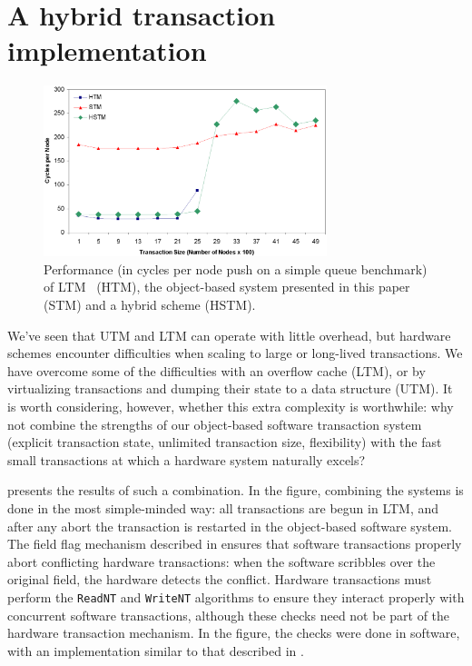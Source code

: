 \section{A hybrid transaction implementation}\label{sec:hybrid}

\begin{figure}\begin{center}%
\includegraphics[width=3.25in,clip=true]{Figures/sean_lie_6b}%
\end{center}%
\caption[Hybrid performance on simple queue benchmark.]
{Performance (in cycles per node push on a simple queue
  benchmark) of LTM~\cite{AnanianAsKuLeLi05} (HTM), the
  object-based system presented in this paper (STM) and a hybrid
  scheme (HSTM).}%
\label{fig:hybrid}%
\end{figure}

We've seen that UTM and LTM can operate
with little overhead, but hardware schemes encounter difficulties
when scaling to large or long-lived transactions.  We have overcome
some of the difficulties with an overflow
cache (LTM), or by virtualizing transactions and dumping their
state to a data structure (UTM).  It is worth
considering, however, whether this extra complexity is worthwhile: why not
combine the strengths of our object-based software transaction system
(explicit transaction state, unlimited transaction size, flexibility)
with the fast small transactions at which a hardware system naturally excels?

 presents the results of such a combination.
In the figure, combining the systems is done
in the most simple-minded way: all transactions are begun in
LTM,
and after any abort the transaction is restarted in the
object-based software system.
  The field flag mechanism described in
 ensures that software transactions properly abort
conflicting hardware transactions: when the software scribbles
\FLAG over the original field, the hardware detects the conflict.
Hardware transactions must perform
the \texttt{ReadNT} and \texttt{WriteNT} algorithms to ensure they
interact properly with concurrent software transactions, although these
checks need not be part of the hardware transaction mechanism.
In the figure, the checks were done in software, with an implementation
similar to that described in .

